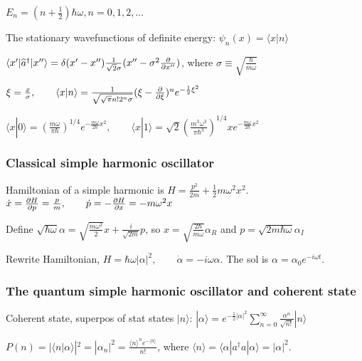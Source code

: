 $E_n = (n + \frac{1}{2}) \hbar \omega, n = 0, 1, 2, ...$

The stationary wavefunctions of definite energy: $\psi_n(x) = \langle x | n \rangle$

$\langle x' | \widehat{a}^{\dag} | x'' \rangle = \delta(x' - x'') \frac{1}{\sqrt{2} \sigma} (x'' - \sigma^2 \pdv{}{x''})$, where $\sigma \equiv \sqrt{\frac{\hbar}{m \omega}}$

$\xi = \frac{x}{\sigma}, \qquad \langle x | n \rangle = \frac{1}{\sqrt{\sqrt{\pi} n! 2^n \sigma}} (\xi - \pdv{}{\xi})^n e^{-\frac{1}{2} \xi^2}$

$\langle x | 0 \rangle = (\frac{m \omega}{\pi \hbar})^{1/4} e^{-\frac{m \omega}{2 \hbar} x^2}, \qquad \langle x | 1 \rangle = \sqrt{2} (\frac{m^3 \omega^3}{\pi \hbar^3})^{1/4} x e^{-\frac{m \omega}{2 \hbar} x^2}$

\subsubsection{Classical simple harmonic oscillator}
Hamiltonian of a simple harmonic is $H = \frac{p^2}{2m} + \frac{1}{2} m \omega^2 x^2. \qquad$ 
$\dot{x} = \pdv{H}{p} = \frac{p}{m}, \qquad \dot{p} = -\pdv{H}{x} = - m \omega^2 x$

Define $\sqrt{\hbar \omega} \alpha = \sqrt{\frac{m \omega^2}{2}} x + \frac{i}{\sqrt{2m}} p$, so $x = \sqrt{\frac{2 \hbar}{m \omega}} \alpha_R$ and $p = \sqrt{2 m \hbar \omega} \alpha_I$

Rewrite Hamiltonian, $H = \hbar \omega | \alpha |^2, \qquad \dot{\alpha} = -i \omega \alpha$. The sol is $\alpha = \alpha_0 e^{-i \omega t}$.

\subsubsection{The quantum simple harmonic oscillator and coherent state}

Coherent state, superpos of stat states $|n \rangle$: $| \alpha \rangle = e^{-\frac{1}{2} |\alpha|^2} \sum_{n=0}^{\infty} \frac{\alpha^n}{\sqrt{n!}} | n \rangle$

$P(n) = |\langle n | \alpha \rangle|^2 = |\alpha_n|^2 = \frac{\langle n \rangle^n e^{-\langle n \rangle}}{n!}$, where $\langle n \rangle = \langle \alpha | a^{\dag} a | \alpha \rangle = | \alpha |^2$.


